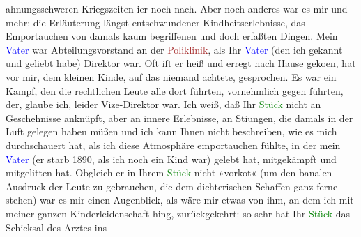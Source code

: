                ahnungsschweren Kriegszeiten i{\geminationm}er noch nach.\pend
           \pstart
           Aber noch anderes war es mir und mehr: die Erläuterung längst entschwundener
               Kindheitserlebnisse, das Emportauchen von damals kaum begriffenen und doch erfaßten
               Dingen. Mein \textcolor{blue}{Vater}{} war
               Abteilungsvorstand an der \textcolor{brown}{Poliklinik}{}\ledrightnote{\textcolor{brown}{Allgemeine Poliklinik}}, als Ihr \textcolor{blue}{Vater}{} (den ich gekannt und
               geliebt habe) Direktor war. Oft iſt er heiß und erregt nach Hause geko{\geminationm}en, hat vor mir, dem kleinen Kinde, auf das niemand
               achtete, gesprochen. Es war ein Kampf, den die rechtlichen Leute alle dort führten,
               vornehmlich gegen \label{K_L02570-2v}\label{K_L02570-2h} führten,
               der, glaube ich, \introOben{}leider\introOben{} Vize-Direktor war. Ich weiß, daß Ihr
                  \textcolor{green}{Stück}{} nicht an Geschehnisse
               anknüpft, aber an innere Erlebnisse, an Sti{\geminationm}ungen, die
               damals in der Luft gelegen haben müßen und ich kann Ihnen nicht beschreiben, wie es
               mich durchschauert hat, als ich diese Atmosphäre emportauchen fühlte, in der mein \textcolor{blue}{Vater}{} (er starb
                  1890, als ich noch ein Kind war) gelebt hat, mitgekämpft und
               mitgelitten hat. Obgleich er in Ihrem \textcolor{green}{Stück}{} nicht »vorko{\geminationm}t« (um den banalen Ausdruck der Leute zu gebrauchen, die dem dichterischen Schaffen
               ganz ferne stehen) war es mir einen Augenblick, als wäre mir etwas von ihm, an dem
               ich mit meiner ganzen Kinderleidenschaft hing, zurückgekehrt: so sehr hat Ihr \textcolor{green}{Stück}{} das Schicksal des Arztes ins
